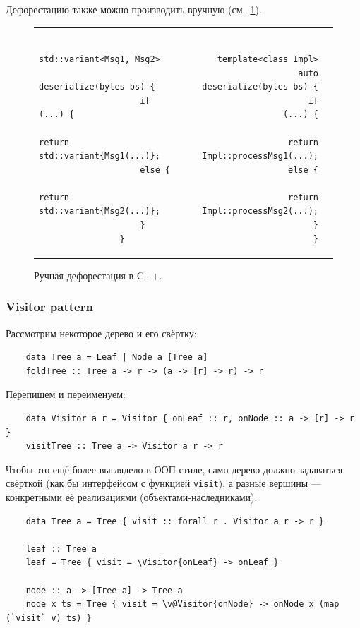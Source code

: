 Дефорестацию также можно производить вручную (см.~\ref{fig:cpp-deforestation}).
\begin{figure}
    \centering
    \begin{tabular}{p{} rl}
        \begin{minipage}[t]{0.5\textwidth}
            \begin{verbatim}
                std::variant<Msg1, Msg2>
                    deserialize(bytes bs) {
                    if (...) {
                        return std::variant{Msg1(...)};
                    else {
                        return std::variant{Msg2(...)};
                    }
                }
            \end{verbatim}
        \end{minipage}
        &
        \begin{minipage}[t]{0.5\textwidth}
            \begin{verbatim}
                template<class Impl>
                auto deserialize(bytes bs) {
                    if (...) {
                        return Impl::processMsg1(...);
                    else {
                        return Impl::processMsg2(...);
                    }
                }
            \end{verbatim}
        \end{minipage}
    \end{tabular}
    \caption{Ручная дефорестация в C++.}
    \label{fig:cpp-deforestation}
\end{figure}

\subsubsection{Visitor pattern} \label{subsubsec:visitor}

Рассмотрим некоторое дерево и его свёртку:
\begin{verbatim}
    data Tree a = Leaf | Node a [Tree a]
    foldTree :: Tree a -> r -> (a -> [r] -> r) -> r
\end{verbatim}

Перепишем и переименуем:
\begin{verbatim}
    data Visitor a r = Visitor { onLeaf :: r, onNode :: a -> [r] -> r }
    visitTree :: Tree a -> Visitor a r -> r
\end{verbatim}

Чтобы это ещё более выглядело в ООП стиле, само дерево должно задаваться свёрткой (как бы интерфейсом с функцией \texttt{visit}), а разные вершины --- конкретными её реализациями (объектами-наследниками):
\begin{verbatim}
    data Tree a = Tree { visit :: forall r . Visitor a r -> r }

    leaf :: Tree a
    leaf = Tree { visit = \Visitor{onLeaf} -> onLeaf }

    node :: a -> [Tree a] -> Tree a
    node x ts = Tree { visit = \v@Visitor{onNode} -> onNode x (map (`visit` v) ts) }
\end{verbatim}

